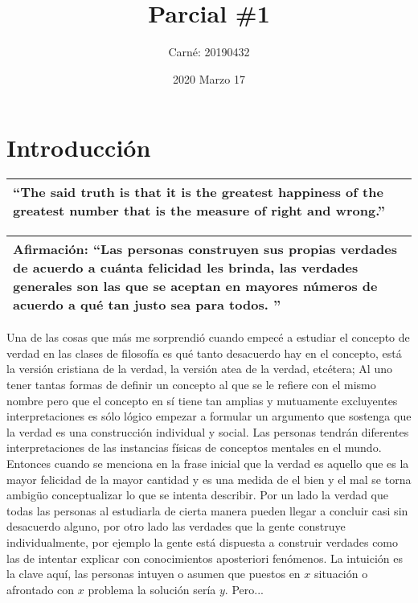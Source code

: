 \documentclass{article}
\title{Parcial \#1}
\date{2020 Marzo 17}
\author{Carné: 20190432}
\begin{document}
\maketitle
\section{Introducción}
\begin{center}
    \begin{tabular}{ |p{14cm}| }
        \hline
            ``The said truth is that it is the greatest happiness of the greatest number that is the measure of right and wrong.'' \\
        \hline
    \end{tabular}
\end{center}
\begin{center}
    \begin{tabular}{ |p{14cm}| }
        \hline
        Afirmación: ``Las personas construyen sus propias verdades de acuerdo a cuánta felicidad les brinda, las verdades generales son las que se aceptan en mayores números de acuerdo a qué tan justo sea para todos. '' \\ 
        \hline
    \end{tabular}
\end{center}
Una de las cosas que más me sorprendió cuando empecé a estudiar el concepto de verdad en las clases de filosofía es qué tanto desacuerdo hay en el concepto, está la versión cristiana de la verdad, la versión atea de la verdad, etcétera; Al uno tener tantas formas de definir un concepto al que se le refiere con el mismo nombre pero que el concepto en sí tiene tan amplias y mutuamente excluyentes interpretaciones es sólo lógico empezar a formular un argumento que sostenga que la verdad es una construcción individual y social. Las personas tendrán diferentes interpretaciones de las instancias físicas de conceptos mentales en el mundo. Entonces cuando se menciona en la frase inicial que la verdad es aquello que es la mayor felicidad de la mayor cantidad y es una medida de el bien y el mal se torna ambigüo conceptualizar lo que se intenta describir. Por un lado la verdad que todas las personas al estudiarla de cierta manera pueden llegar a concluir casi sin desacuerdo alguno, por otro lado las verdades que la gente construye individualmente, por ejemplo la gente está dispuesta a construir verdades como las de intentar explicar con conocimientos aposteriori fenómenos. La intuición es la clave aquí, las personas intuyen o asumen que puestos en $x$ situación o afrontado con $x$ problema la solución sería $y$. Pero...    
\end{document}
